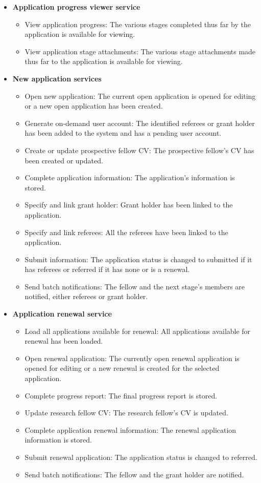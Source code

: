 \documentclass[12pt]{article}
\begin{document}
\begin{itemize}
	\item \textbf{Application progress viewer service}
		\begin{itemize}
			\item View application progress: The various stages completed thus far by the application is available for viewing.
			\item View application stage attachments: The various stage attachments made thus far to the application is available for viewing.
		\end{itemize}
		
	\item \textbf{New application services}
		\begin{itemize}
			\item Open new application: The current open application is opened for editing or a new open application has been created.
			\item Generate on-demand user account: The identified referees or grant holder has been added to the system and has a pending user account.
			\item Create or update prospective fellow CV: The prospective fellow's CV has been created or updated.
			\item Complete application information: The application's information is stored.
			\item Specify and link grant holder: Grant holder has been linked to the application.
			\item Specify and link referees: All the referees have been linked to the application.
			\item Submit information: The application status is changed to submitted if it has referees or referred if it has none or is a renewal.
			\item Send batch notifications: The fellow and the next stage's members are notified, either referees or grant holder. 		
		\end{itemize}
	
	\item \textbf{Application renewal service}
		\begin{itemize}
			\item Load all applications available for renewal: All applications available for renewal has been loaded.
			\item Open renewal application: The currently open renewal application is opened for editing or a new renewal is created for the selected application.
			\item Complete progress report: The final progress report is stored.
			\item Update research fellow CV: The research fellow's CV is updated.
			\item Complete application renewal information: The renewal application information is stored.				
			\item Submit renewal application: The application status is changed to referred.
			\item Send batch notifications: The fellow and the grant holder are notified.									
		\end{itemize}
	

\end{itemize}
\end{document}
